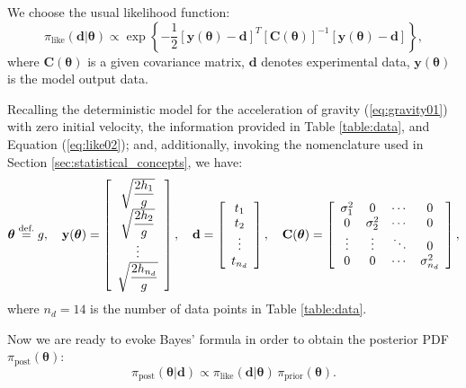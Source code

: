 We choose the usual likelihood function:
\begin{equation}\label{eq:like02}
\pi_{\text{like}}(\mathbf{d} | \boldsymbol{\theta})
\varpropto
\exp
\left\{
-\frac{1}{2}
[\mathbf{y}(\boldsymbol{\theta})-\mathbf{d}]^T
\left[\mathbf{C}(\boldsymbol{\theta})\right]^{-1}
[\mathbf{y}(\boldsymbol{\theta})-\mathbf{d}]
\right\},
\end{equation}
where $\mathbf{C}(\boldsymbol{\theta})$ is a given covariance matrix, $\mathbf{d}$ denotes experimental data, $\mathbf{y}(\boldsymbol{\theta})$ is the model output data.

Recalling the deterministic model for the acceleration of gravity (\ref{eq:gravity01}) with zero initial velocity,  the information provided in Table \ref{table:data}, and Equation (\ref{eq:like02}); and, additionally, invoking the nomenclature used in Section \ref{sec:statistical_concepts}, we have:
\begin{equation}\label{eq:like03}
\boldsymbol{\theta} \stackrel{\small{\text{def.}}}{=} g,
\quad
\mathbf{y}(\boldsymbol{\theta})= 
\left[
\begin{array}{c}
\sqrt{\dfrac{2 h_1}{g}}\\	
\sqrt{\dfrac{2 h_2}{g}}\\	
\vdots\\	
\sqrt{\dfrac{2 h_{n_d}}{g}}
\end{array}
\right],
\quad 
\mathbf{d} = 
\left[
\begin{array}{c}
t_1    \\
t_2    \\ 
\vdots \\	
t_{n_d}
\end{array}
\right],
\quad
\mathbf{C}(\boldsymbol{\theta})=
\left[
\begin{array}{cccc}
\sigma^2_1 & 0	        & \cdots & 0 \\
0          & \sigma^2_2 & \cdots & 0 \\
\vdots     & \vdots     & \ddots & 0 \\
0          & 0          & \cdots & \sigma^2_{n_d}
\end{array}
\right],
\end{equation}
where $n_d=14$ is the number of data points in Table \ref{table:data}.

Now we are ready to evoke Bayes' formula in order to obtain the posterior PDF $\pi_{\text{post}}(\boldsymbol{\theta})$:
\begin{equation}\label{eq-Bayes-g}
\pi_{\text{post}}(\boldsymbol{\theta}|\mathbf{d})\varpropto  \pi_{\text{like}}(\mathbf{d}|\boldsymbol{\theta}) \, \pi_{\text{prior}}(\boldsymbol{\theta}).
\end{equation}


